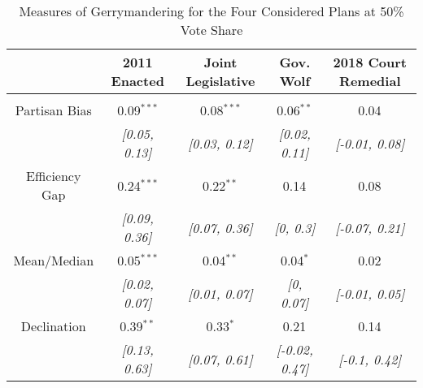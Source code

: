 \begin{table}[!htbp] \centering 
  \caption{Measures of Gerrymandering for the Four Considered Plans at 50\% Vote Share} 
  \label{tab:gerry} 
\begin{tabular}{@{\extracolsep{-5pt}} ccccc} 
 & 2011 Enacted & Joint Legislative & Gov. Wolf & 2018 Court Remedial \\ 
\hline \\[-1.8ex] 
Partisan Bias & 0.09$^{***}$ & 0.08$^{***}$ & 0.06$^{**}$ & 0.04$^{}$ \\ 
 & {\small\textit{[0.05, 0.13]}} & {\small\textit{[0.03, 0.12]}} & {\small\textit{[0.02, 0.11]}} & {\small\textit{[-0.01, 0.08]}} \\ 
Efficiency Gap & 0.24$^{***}$ & 0.22$^{**}$ & 0.14$^{}$ & 0.08$^{}$ \\ 
 & {\small\textit{[0.09, 0.36]}} & {\small\textit{[0.07, 0.36]}} & {\small\textit{[0, 0.3]}} & {\small\textit{[-0.07, 0.21]}} \\ 
Mean/Median & 0.05$^{***}$ & 0.04$^{**}$ & 0.04$^{*}$ & 0.02$^{}$ \\ 
 & {\small\textit{[0.02, 0.07]}} & {\small\textit{[0.01, 0.07]}} & {\small\textit{[0, 0.07]}} & {\small\textit{[-0.01, 0.05]}} \\ 
Declination & 0.39$^{**}$ & 0.33$^{*}$ & 0.21$^{}$ & 0.14$^{}$ \\ 
 & {\small\textit{[0.13, 0.63]}} & {\small\textit{[0.07, 0.61]}} & {\small\textit{[-0.02, 0.47]}} & {\small\textit{[-0.1, 0.42]}} \\ 
\end{tabular}
\end{table}
